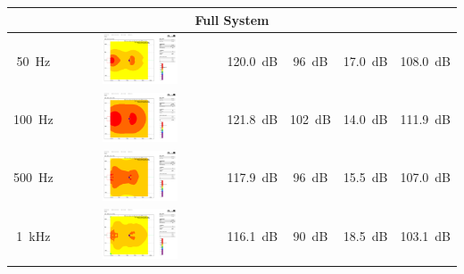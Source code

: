 \begin{longtable}[H]{|c|c|c|c|c|c|}
            \multicolumn{6}{|c|}{\textbf{Full System}}                                                                                                        \\ \hline
            \multicolumn{1}{|c|}{\SI{50}{\Hz}}  & \multicolumn{1}{c|}{\includegraphics[width=0.5\textwidth]{Images/spl_plot_50hz_all.png}}   & \multicolumn{1}{c|}{\SI{120.0}{\dB}} & \multicolumn{1}{c|}{\SI{96}{\dB}}  & \multicolumn{1}{c|}{\SI{17.0}{\dB}} & \SI{108.0}{\dB} \\ \hline
            \multicolumn{1}{|c|}{\SI{100}{\Hz}} & \multicolumn{1}{c|}{\includegraphics[width=0.5\textwidth]{Images/spl_plot_100hz_all.png}}  & \multicolumn{1}{c|}{\SI{121.8}{\dB}} & \multicolumn{1}{c|}{\SI{102}{\dB}} & \multicolumn{1}{c|}{\SI{14.0}{\dB}} & \SI{111.9}{\dB} \\ \hline
            \multicolumn{1}{|c|}{\SI{500}{\Hz}} & \multicolumn{1}{c|}{\includegraphics[width=0.5\textwidth]{Images/spl_plot_500hz.png}}      & \multicolumn{1}{c|}{\SI{117.9}{\dB}} & \multicolumn{1}{c|}{\SI{96}{\dB}}  & \multicolumn{1}{c|}{\SI{15.5}{\dB}} & \SI{107.0}{\dB} \\ \hline
            \multicolumn{1}{|c|}{\SI{1}{\kHz}}  & \multicolumn{1}{c|}{\includegraphics[width=0.5\textwidth]{Images/spl_plot_1khz.png}}       & \multicolumn{1}{c|}{\SI{116.1}{\dB}} & \multicolumn{1}{c|}{\SI{90}{\dB}}  & \multicolumn{1}{c|}{\SI{18.5}{\dB}} & \SI{103.1}{\dB} \\ \hline

\end{longtable}

